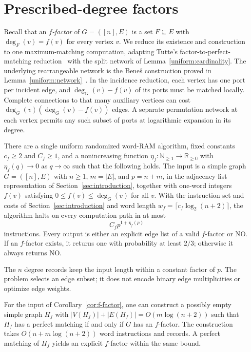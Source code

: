 \section{Prescribed-degree factors}\label{sec:f-factors}

Recall that an \emph{$f$-factor} of $G=([n],E)$ is a set $F\subseteq E$
with $\deg_F(v)=f(v)$ for every vertex $v$. We reduce its existence and
construction to one maximum-matching computation, adapting Tutte's
factor-to-perfect-matching reduction~\cite{Tutte1954Factor} with the split
network of Lemma~\ref{uniform:cardinality}. The underlying rearrangeable
network is the Bene\v{s} construction proved in
Lemma~\ref{uniform:network}~\cite{PermutationNetworks}.
In the incidence reduction, each vertex has one port per incident edge,
and $\deg_G(v)-f(v)$ of its ports must be matched locally. Complete
connections to that many auxiliary vertices can cost
$\deg_G(v)(\deg_G(v)-f(v))$ edges. A separate permutation network at
each vertex permits any such subset of ports at logarithmic expansion
in its degree.

\begin{corollary}
\label{cor:f-factor}
There are a single uniform randomized word-RAM algorithm, fixed constants
$c_f\ge2$ and $C_f\ge1$, and a nonincreasing function
$\eta_f:\mathbb N_{\ge1}\to\mathbb R_{\ge0}$ with $\eta_f(q)\to0$ as
$q\to\infty$ such that the following holds.
The input is a simple graph $G=([n],E)$ with $n\ge1$, $m=|E|$, and
$p=n+m$, in the adjacency-list representation of Section~\ref{sec:introduction},
together with one-word integers $f(v)$ satisfying
$0\le f(v)\le\deg_G(v)$ for all $v$.
With the instruction set and costs of Section~\ref{sec:introduction} and
word length $w_f=\lceil c_f\log_2(n+2)\rceil$, the algorithm halts on every
computation path in at most
\[
                         C_f p^{1+\eta_f(p)}
\]
instructions. Every output is either an explicit edge list of a valid
$f$-factor or \textnormal{NO}. If an $f$-factor exists, it returns one with
probability at least $2/3$; otherwise it always returns \textnormal{NO}.
\end{corollary}

The $n$ degree records keep the input length within a constant factor of
$p$. The problem selects an edge subset; it does not encode binary edge
multiplicities or optimize edge weights.

\begin{lemma}
\label{factor:reduction}
For the input of Corollary~\ref{cor:f-factor}, one can construct a possibly
empty simple graph $H_f$ with
$|V(H_f)|+|E(H_f)|=O(m\log(n+2))$
such that $H_f$ has a perfect matching if and only if $G$ has an $f$-factor.
The construction takes $O(n+m\log(n+2))$ word instructions and records.
A perfect matching of $H_f$ yields an explicit $f$-factor within the same
bound.
\end{lemma}


